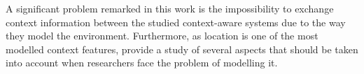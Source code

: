 A significant problem remarked in this work is the impossibility to exchange
context information between the studied context-aware systems due to the way
they model the environment. Furthermore, as location is one of the most 
modelled context features, \citeauthor{chen_survey_2000} provide a study of 
several aspects that should be taken into account when researchers face the 
problem of modelling it. 




